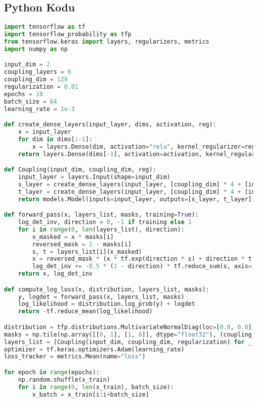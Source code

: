 \subsection{Python Kodu}

\begin{lstlisting}[language=Python]
import tensorflow as tf
import tensorflow_probability as tfp
from tensorflow.keras import layers, regularizers, metrics
import numpy as np

input_dim = 2
coupling_layers = 6
coupling_dim = 128
regularization = 0.01
epochs = 10
batch_size = 64
learning_rate = 1e-3

def create_dense_layers(input_layer, dims, activation, reg):
    x = input_layer
    for dim in dims[:-1]:
        x = layers.Dense(dim, activation="relu", kernel_regularizer=regularizers.l2(reg))(x)
    return layers.Dense(dims[-1], activation=activation, kernel_regularizer=regularizers.l2(reg))(x)

def Coupling(input_dim, coupling_dim, reg):
    input_layer = layers.Input(shape=input_dim)
    s_layer = create_dense_layers(input_layer, [coupling_dim] * 4 + [input_dim], "tanh", reg)
    t_layer = create_dense_layers(input_layer, [coupling_dim] * 4 + [input_dim], "linear", reg)
    return models.Model(inputs=input_layer, outputs=[s_layer, t_layer])

def forward_pass(x, layers_list, masks, training=True):
    log_det_inv, direction = 0, -1 if training else 1
    for i in range(0, len(layers_list), direction):
        x_masked = x * masks[i]
        reversed_mask = 1 - masks[i]
        s, t = layers_list[i](x_masked)
        x = reversed_mask * (x * tf.exp(direction * s) + direction * t * tf.exp(-0.5 * (1 - direction) * s)) + x_masked
        log_det_inv += -0.5 * (1 - direction) * tf.reduce_sum(s, axis=1)
    return x, log_det_inv

def compute_log_loss(x, distribution, layers_list, masks):
    y, logdet = forward_pass(x, layers_list, masks)
    log_likelihood = distribution.log_prob(y) + logdet
    return -tf.reduce_mean(log_likelihood)

distribution = tfp.distributions.MultivariateNormalDiag(loc=[0.0, 0.0], scale_diag=[1.0, 1.0])
masks = np.tile(np.array([[0, 1], [1, 0]], dtype="float32"), (coupling_layers // 2, 1))
layers_list = [Coupling(input_dim, coupling_dim, regularization) for _ in range(coupling_layers)]
optimizer = tf.keras.optimizers.Adam(learning_rate)
loss_tracker = metrics.Mean(name="loss")

for epoch in range(epochs):
    np.random.shuffle(x_train)
    for i in range(0, len(x_train), batch_size):
        x_batch = x_train[i:i+batch_size]
        

\end{lstlisting}
